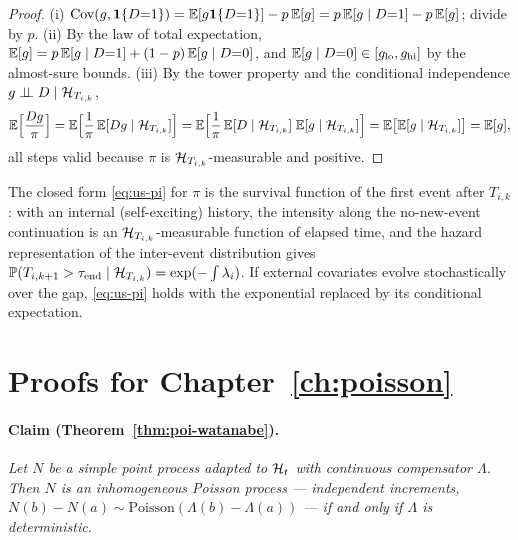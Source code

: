 \begin{proof}
(i) $\mathrm{Cov}(g, \mathbf{1}\{D{=}1\}) = \mathbb{E}[g \mathbf{1}\{D{=}1\}] - p\,\mathbb{E}[g] = p\,\mathbb{E}[g \mid D{=}1] - p\,\mathbb{E}[g]$; divide
by $p$. (ii) By the law of total expectation, $\mathbb{E}[g] = p\,\mathbb{E}[g \mid D{=}1] + (1-p)\,\mathbb{E}[g \mid
D{=}0]$, and $\mathbb{E}[g \mid D{=}0] \in [g_{\mathrm{lo}}, g_{\mathrm{hi}}]$ by the almost-sure bounds.
(iii) By the tower property and the conditional independence $g \perp\!\!\!\perp D \mid \mathcal{H}_{T_{i,k}}$,
\[
\mathbb{E}\Big[\frac{D g}{\pi}\Big]
= \mathbb{E}\Big[\frac{1}{\pi}\, \mathbb{E}[D g \mid \mathcal{H}_{T_{i,k}}]\Big]
= \mathbb{E}\Big[\frac{1}{\pi}\, \mathbb{E}[D \mid \mathcal{H}_{T_{i,k}}]\; \mathbb{E}[g \mid \mathcal{H}_{T_{i,k}}]\Big]
= \mathbb{E}\big[\mathbb{E}[g \mid \mathcal{H}_{T_{i,k}}]\big] = \mathbb{E}[g],
\]
all steps valid because $\pi$ is $\mathcal{H}_{T_{i,k}}$-measurable and positive.
\end{proof}

\begin{remark}
\label{rem:app-pi}
The closed form \eqref{eq:us-pi} for $\pi$ is the survival function of the first event after
$T_{i,k}$: with an internal (self-exciting) history, the intensity along the no-new-event
continuation is an $\mathcal{H}_{T_{i,k}}$-measurable function of elapsed time, and the hazard
representation of the inter-event distribution \cite[Ch.~7.2]{daley2003} gives $\mathbb{P}(T_{i,k+1} >
\tau_{\mathrm{end}} \mid \mathcal{H}_{T_{i,k}}) = \exp(-\int \lambda_i)$. If external covariates evolve
stochastically over the gap, \eqref{eq:us-pi} holds with the exponential replaced by its conditional
expectation.
\end{remark}

\section{Proofs for Chapter~\ref{ch:poisson}}
\label{app:proofs-ch7}

\paragraph{Claim (Theorem~\ref{thm:poi-watanabe}).}
\emph{Let $N$ be a simple point process adapted to $\mathcal{H}_t$ with continuous compensator $\Lambda$.
Then $N$ is an inhomogeneous Poisson process --- independent increments, $N(b) - N(a) \sim
\mathrm{Poisson}(\Lambda(b) - \Lambda(a))$ --- if and only if $\Lambda$ is deterministic.}

